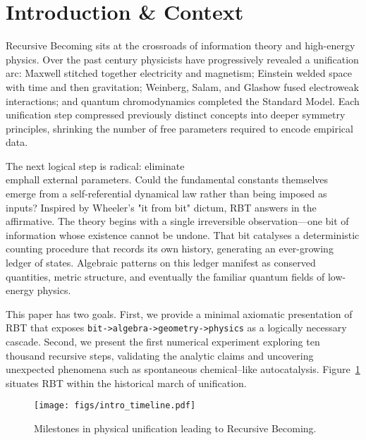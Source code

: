 \section{Introduction \& Context}
\label{sec:intro}

Recursive Becoming sits at the crossroads of information theory and high-energy physics.  Over the past century physicists have progressively revealed a unification arc: Maxwell stitched together electricity and magnetism; Einstein welded space with time and then gravitation; Weinberg, Salam, and Glashow fused electroweak interactions; and quantum chromodynamics completed the Standard Model.  Each unification step compressed previously distinct concepts into deeper symmetry principles, shrinking the number of free parameters required to encode empirical data.

The next logical step is radical: eliminate \\emph{all} external parameters.  Could the fundamental constants themselves emerge from a self-referential dynamical law rather than being imposed as inputs?  Inspired by Wheeler's "it from bit" dictum, RBT answers in the affirmative.  The theory begins with a single irreversible observation---one bit of information whose existence cannot be undone.  That bit catalyses a deterministic counting procedure that records its own history, generating an ever-growing ledger of states.  Algebraic patterns on this ledger manifest as conserved quantities, metric structure, and eventually the familiar quantum fields of low-energy physics.

This paper has two goals.  First, we provide a minimal axiomatic presentation of RBT that exposes \texttt{bit->algebra->geometry->physics} as a logically necessary cascade.  Second, we present the first numerical experiment exploring ten thousand recursive steps, validating the analytic claims and uncovering unexpected phenomena such as spontaneous chemical--like autocatalysis.  Figure~\ref{fig:intro-timeline} situates RBT within the historical march of unification.

\begin{figure}[h]
  \centering
  \texttt{[image: figs/intro\_timeline.pdf]}
  \caption{Milestones in physical unification leading to Recursive Becoming.}
  \label{fig:intro-timeline}
\end{figure}
\clearpage 